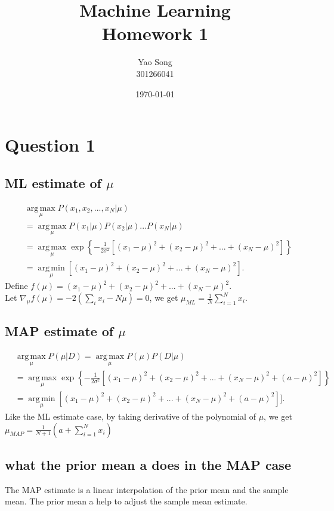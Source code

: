 \documentclass[paper=a4, fontsize=11pt]{article} %
\title{	
Machine Learning \\
Homework 1
}
\author{Yao Song\\301266041} %
\date{\normalsize\today} %
\begin{document}
\maketitle %


\section{Question 1}
\subsection{ML estimate of $\mu$}

\begin{align}
&\operatorname*{arg\,max}_{\mu} P({x_1,x_2,...,x_N}|\mu) \\
&= \operatorname*{arg\,max}_{\mu} P(x_1|\mu) P(x_2|\mu)... P(x_N|\mu)\\
&=\operatorname*{arg\,max}_{\mu} \exp \left\lbrace -\frac{1}{2\sigma^2} [(x_1 -\mu)^2+(x_2 -\mu)^2 +...+(x_N -\mu)^2]\right\rbrace\\
&=\operatorname*{arg\,min}_{\mu} [(x_1 -\mu)^2+(x_2 -\mu)^2 +...+(x_N -\mu)^2].
\end{align}
Define $f(\mu)  = (x_1 -\mu)^2+(x_2 -\mu)^2 +...+(x_N -\mu)^2$.\\
Let $\nabla_{\mu} f(\mu)  = -2(\sum_i x_i - N\mu) = 0$, we get 
$\mu_{ML} = \frac{1}{N}\sum_{i=1}^N x_i$.
\subsection{MAP estimate of $\mu$}
\begin{align}
&\operatorname*{arg\,max}_{\mu} P(\mu|D) 
=\operatorname*{arg\,max}_{\mu} P(\mu)P(D|\mu) \\
&=\operatorname*{arg\,max}_{\mu} \exp \left\lbrace -\frac{1}{2\sigma^2} [(x_1 -\mu)^2+(x_2 -\mu)^2 +...+(x_N -\mu)^2 + (a-\mu)^2]\right\rbrace\\
&=\operatorname*{arg\,min}_{\mu} [(x_1 -\mu)^2+(x_2 -\mu)^2 +...+(x_N -\mu)^2 +(a-\mu)^2]].
\end{align}
Like the ML estimate case, by taking derivative of the polynomial of $\mu$, we get 
$\mu_{MAP} = \frac{1}{N+1}(a + \sum_{i=1}^N x_i ) $
\subsection{what the prior mean a does in the MAP case}
The MAP estimate is a linear interpolation of the prior mean and the sample mean. 
The prior mean a help to adjust the sample mean estimate.
\end{document}
